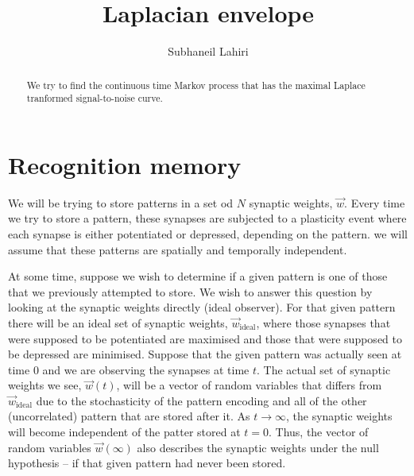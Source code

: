 \documentclass[12pt]{article}
\title{Laplacian envelope}
\author{Subhaneil Lahiri
%
}
\newcommand{\syn}{\vec{w}}
\newcommand{\synid}{\syn_\text{ideal}}
\begin{document}
\maketitle




\begin{abstract}
  We try to find the continuous time Markov process that has the maximal Laplace tranformed signal-to-noise curve.
\end{abstract}

\tableofcontents



\section{Recognition memory}\label{sec:recog}


We will be trying to store patterns in a set od $N$ synaptic weights, $\syn$.
Every time we try to store a pattern, these synapses are subjected to a plasticity event where each synapse is either potentiated or depressed, depending on the pattern.
we will assume that these patterns are spatially and temporally independent.

At some time, suppose we wish to determine if a given pattern is one of those that we previously attempted to store.
We wish to answer this question by looking at the synaptic weights directly (ideal observer).
For that given pattern there will be an ideal set of synaptic weights, $\synid$, where those synapses that were supposed to be potentiated are maximised and those that were supposed to be depressed are minimised.
Suppose that the given pattern was actually seen at time 0 and we are observing the synapses at time $t$.
The actual set of synaptic weights we see, $\syn(t)$, will be a vector of random variables that differs from $\synid$ due to the stochasticity of the pattern encoding and all of the other (uncorrelated) pattern that are stored after it.
As $t\to\infty$, the synaptic weights will become independent of the patter stored at $t=0$.
Thus, the vector of random variables $\syn(\infty)$ also describes the synaptic weights under the null hypothesis -- if that given pattern had never been stored.
\end{document}
